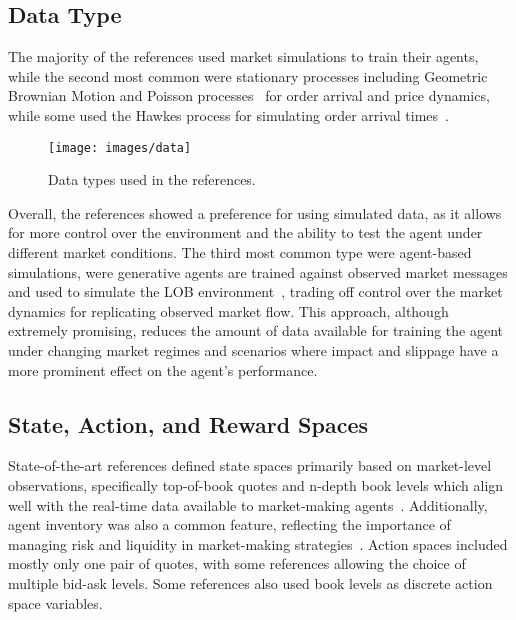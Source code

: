 \subsection{Data Type}
\label{subsec:data-type}
The majority of the references used market simulations to train their agents,
while the second most common were stationary processes including Geometric Brownian Motion and Poisson processes~\cite{Gasperov2021, Sun2022} for
order arrival and price dynamics, while some used the Hawkes process for simulating order arrival times~\cite{Jerome2022, Selser2021}.

\begin{figure}
    \centering
    \texttt{[image: images/data]}
    \caption{Data types used in the references.}
    \label{fig:figure7}
\end{figure}

Overall, the references showed a preference for using simulated data,
as it allows for more control over the environment and the ability to test the agent under different market conditions.
The third most common type were agent-based simulations, were generative agents are trained
against observed market messages and used to simulate the LOB environment~\cite{Frey2023, Ganesh2019},
trading off control over the market dynamics for replicating observed market flow.
This approach, although extremely promising, reduces the amount of data available for training the agent
under changing market regimes and scenarios where impact and slippage have a more prominent effect on the agent's performance.

\subsection{State, Action, and Reward Spaces}
\label{subsec:spaces}
State-of-the-art references defined state spaces primarily based on market-level observations,
specifically top-of-book quotes and n-depth book levels which align well with the real-time data available to market-making agents~\cite{He2023, Bakshaev2020}.
Additionally, agent inventory was also a common feature, reflecting the importance of managing risk and liquidity in market-making strategies~\cite{Patel2018, Ganesh2019}.
Action spaces included mostly only one pair of quotes, with some references allowing the choice of multiple bid-ask levels.
Some references also used book levels as discrete action space variables.

